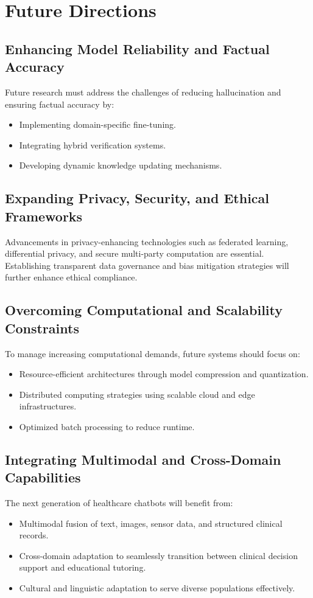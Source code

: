 \section{Future Directions}

\subsection{Enhancing Model Reliability and Factual Accuracy}
Future research must address the challenges of reducing hallucination and ensuring factual accuracy by:
\begin{itemize}
    \item Implementing domain-specific fine-tuning.
    \item Integrating hybrid verification systems.
    \item Developing dynamic knowledge updating mechanisms.
\end{itemize}

\subsection{Expanding Privacy, Security, and Ethical Frameworks}
Advancements in privacy-enhancing technologies such as federated learning, differential privacy, and secure multi-party computation are essential. Establishing transparent data governance and bias mitigation strategies will further enhance ethical compliance.

\subsection{Overcoming Computational and Scalability Constraints}
To manage increasing computational demands, future systems should focus on:
\begin{itemize}
    \item Resource-efficient architectures through model compression and quantization.
    \item Distributed computing strategies using scalable cloud and edge infrastructures.
    \item Optimized batch processing to reduce runtime.
\end{itemize}

\subsection{Integrating Multimodal and Cross-Domain Capabilities}
The next generation of healthcare chatbots will benefit from:
\begin{itemize}
    \item Multimodal fusion of text, images, sensor data, and structured clinical records.
    \item Cross-domain adaptation to seamlessly transition between clinical decision support and educational tutoring.
    \item Cultural and linguistic adaptation to serve diverse populations effectively.
\end{itemize}

